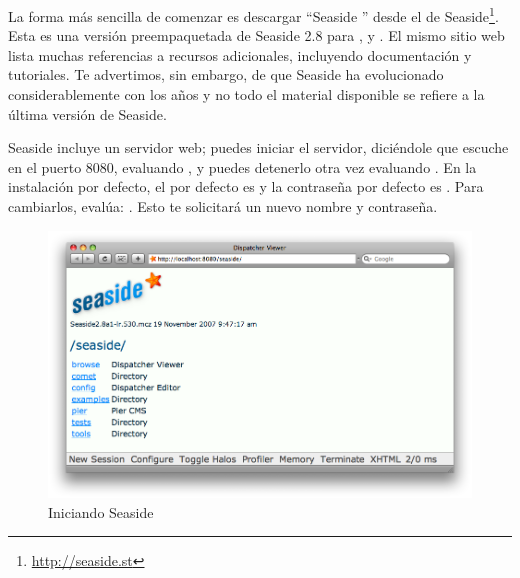 \documentclass[a4paper,10pt,twoside]{book}
\begin{document}
La forma más sencilla de comenzar es descargar ``Seaside '' desde el  de Seaside\footnote{\url{http://seaside.st}}.
Esta es una versión preempaquetada de Seaside 2.8 para ,  y .
El mismo sitio web lista muchas referencias a recursos adicionales, incluyendo documentación y tutoriales.
Te advertimos, sin embargo, de que Seaside ha evolucionado considerablemente con los años y no todo el material disponible se refiere a la última versión de Seaside.



Seaside incluye un servidor web; puedes iniciar el servidor, diciéndole que escuche en el puerto 8080, evaluando  ,
y puedes detenerlo otra vez evaluando .
En la instalación por defecto, el  por defecto es  y la contraseña por defecto es .
Para cambiarlos, evalúa:  .
Esto te solicitará un nuevo nombre y contraseña.

\begin{figure}[tbh]
\begin{center}
\includegraphics[width=\textwidth]{seasideStartup}
\caption{Iniciando Seaside}
\end{center}
\end{figure}
\end{document}
